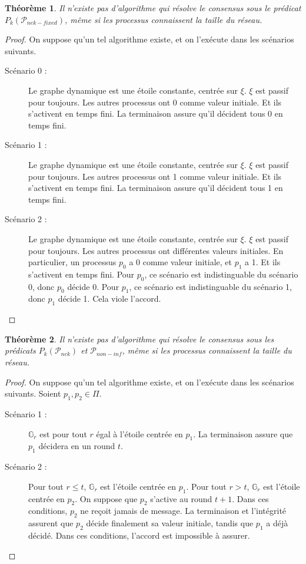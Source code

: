\documentclass{article}
\newtheorem{theorem}{Théorème}
\begin{document}
\begin{theorem}
	Il n'existe pas d'algorithme qui résolve le consensus sous le prédicat $P_k(\mathcal{P}_{nek-fixed})$, même si les processus connaissent la taille du réseau.
\end{theorem}
\begin{proof}
	On suppose qu'un tel algorithme existe, et on l'exécute dans les scénarios suivants.

	\begin{description}
		\item[Scénario 0 : ] Le graphe dynamique est une étoile constante, centrée sur $\xi$. $\xi$ est passif pour toujours. Les autres processus ont 0 comme valeur initiale.
			Et ils s'activent en temps fini. La terminaison assure qu'il décident tous 0 en temps fini.

		\item[Scénario 1 : ] Le graphe dynamique est une étoile constante, centrée sur $\xi$. $\xi$ est passif pour toujours. Les autres processus ont 1 comme valeur initiale.
			Et ils s'activent en temps fini. La terminaison assure qu'il décident tous 1 en temps fini.

		\item[Scénario 2 : ] Le graphe dynamique est une étoile constante, centrée sur $\xi$. $\xi$ est passif pour toujours. Les autres processus ont différentes valeurs initiales.
			En particulier, un processus $p_0$ a 0 comme valeur initiale, et $p_1$ a 1.
			Et ils s'activent en temps fini. Pour $p_0$, ce scénario est indistinguable du scénario 0, donc $p_0$ décide 0.
			Pour $p_1$, ce scénario est indistinguable du scénario 1, donc $p_1$ décide 1.  Cela viole l'accord.
	\end{description}
\end{proof}

\begin{theorem}
	Il n'existe pas d'algorithme qui résolve le consensus sous les prédicats $P_k(\mathcal{P}_{nek})$ et $\mathcal{P}_{non-inf}$, même si les processus connaissent la taille du réseau.
\end{theorem}
\begin{proof}
	On suppose qu'un tel algorithme existe, et on l'exécute dans les scénarios suivants.
	Soient $p_1, p_2 \in \Pi$.
	\begin{description}

		\item[Scénario 1 :] $\mathds{G}_r$ est pour tout $r$ égal à l'étoile centrée en $p_1$. La terminaison assure que $p_1$ décidera en un round $t$.
		\item[Scénario 2 :] Pour tout $r \leq t$, $\mathds{G}_r$ est l'étoile centrée en $p_1$. Pour tout $r > t$, $\mathds{G}_r$ est l'étoile centrée en $p_2$. On suppose que $p_2$
			s'active au round $t+1$. Dans ces conditions, $p_2$ ne reçoit jamais de message. La terminaison et l'intégrité assurent que $p_2$ décide finalement sa valeur initiale,
			tandis que $p_1$ a déjà décidé. Dans ces conditions, l'accord est impossible à assurer.

	\end{description}
\end{proof}
\end{document}
